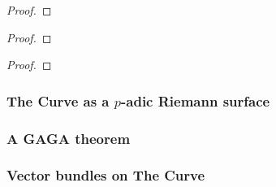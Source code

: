                 \begin{theorem} \label{theorem: fargues_fontaine_space_as_moduli_space_of_untilts}
                    
                \end{theorem}
                    \begin{proof}
                        
                    \end{proof}
                    
                \begin{theorem} \label{theorem: fargues_fontaine_space_as_punctured_disc}
                    
                \end{theorem}
                
                \begin{lemma} \label{the_covering_space_is_a_diamond}
                    
                \end{lemma}
                    \begin{proof}
                        
                    \end{proof}
                \begin{theorem} \label{theorem: the_fargues_fontaine_space_is_perfectoid}
                    
                \end{theorem}
                    \begin{proof}
                        
                    \end{proof}
                \begin{corollary} \label{coro: discontinuity_of_frobenius}
                    
                \end{corollary}
                
            \subsubsection{The Curve as a \texorpdfstring{$p$}{}-adic Riemann surface}
            
            \subsubsection{A GAGA theorem}
            
            \subsubsection{Vector bundles on The Curve}